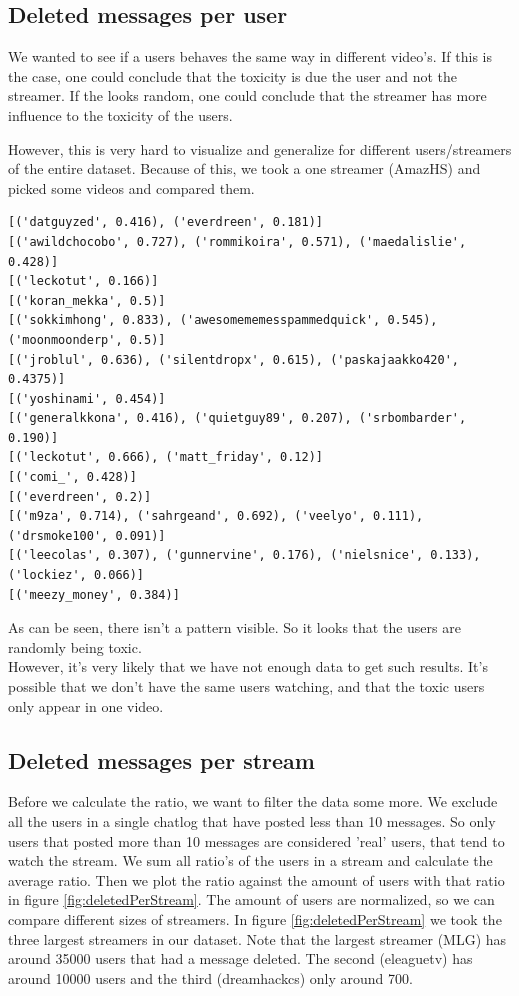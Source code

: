 \documentclass[final]{report}
\begin{document}
\subsection{Deleted messages per user}
We wanted to see if a users behaves the same way in different video's. If this is the case, one could conclude that the toxicity is due the user and not the streamer. If the looks random, one could conclude that the streamer has more influence to the toxicity of the users.

However, this is very hard to visualize and generalize for different users/streamers of the entire dataset.
Because of this, we took a one streamer (AmazHS) and picked some videos and compared them.

\begin{verbatim}
[('datguyzed', 0.416), ('everdreen', 0.181)]
[('awildchocobo', 0.727), ('rommikoira', 0.571), ('maedalislie', 0.428)]
[('leckotut', 0.166)]
[('koran_mekka', 0.5)]
[('sokkimhong', 0.833), ('awesomememesspammedquick', 0.545), ('moonmoonderp', 0.5)]
[('jroblul', 0.636), ('silentdropx', 0.615), ('paskajaakko420', 0.4375)]
[('yoshinami', 0.454)]
[('generalkkona', 0.416), ('quietguy89', 0.207), ('srbombarder', 0.190)]
[('leckotut', 0.666), ('matt_friday', 0.12)]
[('comi_', 0.428)]
[('everdreen', 0.2)]
[('m9za', 0.714), ('sahrgeand', 0.692), ('veelyo', 0.111), ('drsmoke100', 0.091)]
[('leecolas', 0.307), ('gunnervine', 0.176), ('nielsnice', 0.133), ('lockiez', 0.066)]
[('meezy_money', 0.384)]
\end{verbatim}

As can be seen, there isn't a pattern visible. So it looks that the users are randomly being toxic.\\
However, it's very likely that we have not enough data to get such results. It's possible that we don't have the same users watching, and that the toxic users only appear in one video.

\subsection{Deleted messages per stream}
Before we calculate the ratio, we want to filter the data some more. We exclude all the users in a single chatlog that have posted less than 10 messages. So only users that posted more than 10 messages are considered 'real' users, that tend to watch the stream. 
We sum all ratio's of the users in a stream and calculate the average ratio. Then we plot the ratio against the amount of users with that ratio in figure \ref{fig:deletedPerStream}. The amount of users are normalized, so we can compare different sizes of streamers.
In figure \ref{fig:deletedPerStream} we took the three largest streamers in our dataset. Note that the largest streamer (MLG) has around 35000 users that had a message deleted. The second (eleaguetv) has around 10000 users and the third (dreamhackcs) only around 700.
\end{document}
